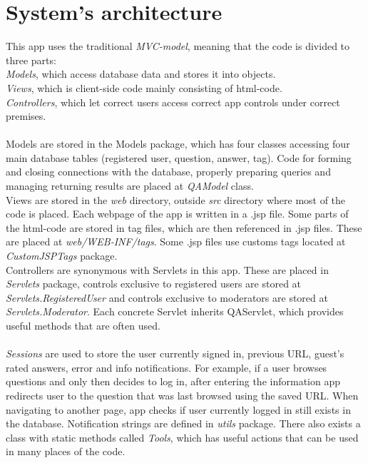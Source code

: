 \documentclass[a4paper,12pt]{article}
\begin{document}
\section{System's architecture}
This app uses the traditional \emph{MVC-model}, meaning that the code is divided to three parts:\\
\emph{Models}, which access database data and stores it into objects.\\
\emph{Views}, which is client-side code mainly consisting of html-code.\\
\emph{Controllers}, which let correct users access correct app controls under correct premises.\\
\\
Models are stored in the Models package, which has four classes accessing four main database tables (registered user, question, answer, tag). Code for forming and closing connections with the database, properly preparing queries and managing returning results are placed at \emph{QAModel} class.\\
Views are stored in the \emph{web} directory, outside \emph{src} directory where most of the code is placed. Each webpage of the app is written in a .jsp file. Some parts of the html-code are stored in tag files, which are then referenced in .jsp files. These are placed at \emph{web/WEB-INF/tags}. Some .jsp files use customs tags located at \emph{CustomJSPTags} package.\\
Controllers are synonymous with Servlets in this app. These are placed in \emph{Servlets} package, controls exclusive to registered users are stored at \\
\emph{Servlets.RegisteredUser} and controls exclusive to moderators are stored at \emph{Servlets.Moderator}. Each concrete Servlet inherits QAServlet, which provides useful methods that are often used.\\
\\
\emph{Sessions} are used to store the user currently signed in, previous URL, guest's rated answers, error and info notifications. For example, if a user browses questions and only then decides to log in, after entering the information app redirects user to the question that was last browsed using the saved URL. When navigating to another page, app checks if user currently logged in still exists in the database. Notification strings are defined in \emph{utils} package. There also exists a class with static methods called \emph{Tools}, which has useful actions that can be used in many places of the code.
\newpage
\end{document}
